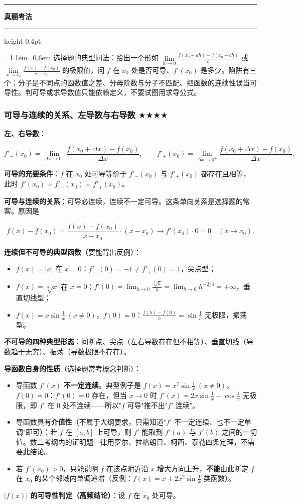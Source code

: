 \documentclass[11pt,openany,UTF8]{ctexbook}
\newcommand{\callouthead}[2]{%
  \par\addvspace{7pt}\noindent
  {\color{#1}\rule[-0.15em]{3pt}{1.05em}}\hspace{0.5em}%
  {\bfseries\color{#1}#2}\par\nobreak\vspace{-0.35em}%
  {\color{rulesep}\hrule height 0.4pt}\nobreak\vspace{0.45em}%
  \begingroup\small\setlength{\parindent}{0pt}%
  \leftskip=1.1em\rightskip=0.6em\noindent\ignorespaces}
\newcommand{\calloutend}{\par\endgroup\addvspace{7pt}}
\newenvironment{callexam}[1]{\callouthead{exambar}{#1}}{\calloutend}
\begin{document}
\begin{callexam}{真题考法}
选择题的典型问法：给出一个形如 $\lim\limits_{h\to 0}\frac{f(x_0+ah)-f(x_0+bh)}{h}$ 或 $\lim\limits_{x\to x_0}\frac{f(x)-f(x_0)}{x-x_0}$ 的极限值，问 $f$ 在 $x_0$ 处是否可导、$f'(x_0)$ 是多少。陷阱有三个：分子是不同点的函数值之差、分母阶数与分子不匹配、把函数的连续性误当可导性。判可导或求导数值只能依赖定义，不要试图用求导公式。

\end{callexam}

\subsubsection{可导与连续的关系、左导数与右导数 $\bigstar$$\bigstar$$\bigstar$$\bigstar$}

\textbf{左、右导数}：

\[f'_-(x_0)=\lim_{\Delta x\to 0^-}\frac{f(x_0+\Delta x)-f(x_0)}{\Delta x},
\qquad
f'_+(x_0)=\lim_{\Delta x\to 0^+}\frac{f(x_0+\Delta x)-f(x_0)}{\Delta x}.\]

\textbf{可导的充要条件}：$f$ 在 $x_0$ 处可导等价于 $f'_-(x_0)$ 与 $f'_+(x_0)$ 都存在且相等，此时 $f'(x_0)=f'_-(x_0)=f'_+(x_0)$。

\textbf{可导与连续的关系}：可导必连续，连续不一定可导。这条单向关系是选择题的常客。原因是

\[f(x)-f(x_0)=\frac{f(x)-f(x_0)}{x-x_0}\cdot(x-x_0)\to f'(x_0)\cdot 0=0\quad(x\to x_0).\]

\textbf{连续但不可导的典型函数}（要能背出反例）：

\begin{itemize}
\item $f(x)=|x|$ 在 $x=0$：$f'_-(0)=-1\ne f'_+(0)=1$，尖点型；
\item $f(x)=\sqrt[3]{x}$ 在 $x=0$：$f'(0)=\lim_{h\to 0}\frac{\sqrt[3]{h}}{h}=\lim_{h\to 0}h^{-2/3}=+\infty$，垂直切线型；
\item $f(x)=x\sin\frac1x\ (x\ne 0)$，$f(0)=0$：$\frac{f(h)-f(0)}{h}=\sin\frac1h$ 无极限，振荡型。
\end{itemize}
\textbf{不可导的四种典型形态}：间断点、尖点（左右导数存在但不相等）、垂直切线（导数趋于无穷）、振荡（导数极限不存在）。

\textbf{导函数自身的性质}（选择题常考概念判断）：

\begin{itemize}
\item 导函数 $f'(x)$ \textbf{不一定连续}。典型例子是 $f(x)=x^2\sin\frac1x\ (x\ne0)$，$f(0)=0$：$f'(0)=0$ 存在，但当 $x\to0$ 时 $f'(x)=2x\sin\frac1x-\cos\frac1x$ 无极限，即 $f'$ 在 $0$ 处不连续——所以"$f$ 可导"推不出"$f'$ 连续"。
\item 导函数具有\textbf{介值性}（不属于大纲要求，只需知道"$f'$ 不一定连续、也不一定单调"即可）：若 $f$ 在 $[a,b]$ 上可导，则 $f'$ 能取到 $f'(a)$ 与 $f'(b)$ 之间的一切值。数二考纲内的证明题一律用罗尔、拉格朗日、柯西、泰勒四条定理，不需要此结论。
\item 若 $f'(x_0)>0$，只能说明 $f$ 在该点附近沿 $x$ 增大方向上升，\textbf{不能}由此断定 $f$ 在 $x_0$ 的某个邻域内单调递增（反例：$f(x)=x+2x^2\sin\frac1x$ 类函数）。
\end{itemize}
\textbf{$|f(x)|$ 的可导性判定（高频结论）}：设 $f$ 在 $x_0$ 处可导。
\end{document}
